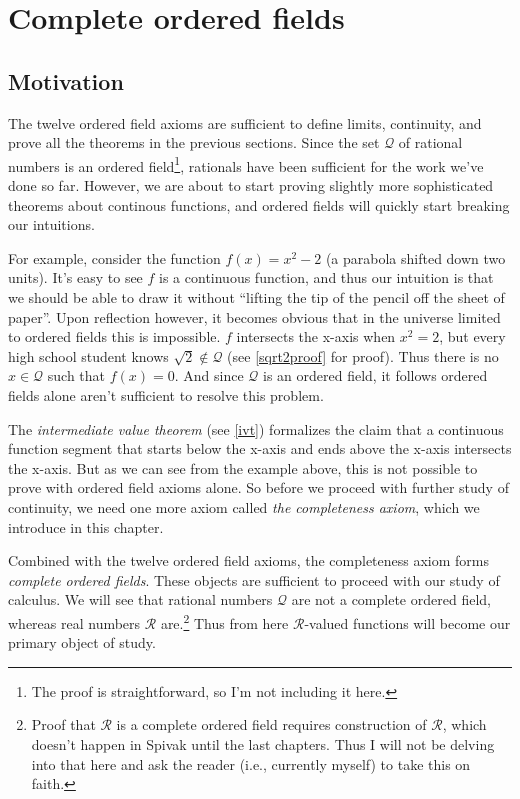\section{Complete ordered fields}

\subsection{Motivation}
The twelve ordered field axioms are sufficient to define limits,
continuity, and prove all the theorems in the previous sections. Since
the set $\mathcal{Q}$ of rational numbers is an ordered field\footnote{The proof
  is straightforward, so I'm not including it here.}, rationals have
been sufficient for the work we've done so far. However, we are about
to start proving slightly more sophisticated theorems about continous
functions, and ordered fields will quickly start breaking our
intuitions.

\vs

For example, consider the function $f(x)=x^{2}-2$ (a parabola shifted
down two units). It's easy to see $f$ is a continuous function, and
thus our intuition is that we should be able to draw it without
``lifting the tip of the pencil off the sheet of paper''. Upon
reflection however, it becomes obvious that in the universe limited to
ordered fields this is impossible. $f$ intersects the x-axis when
$x^{2}=2$, but every high school student knows
$\sqrt{2}\notin\mathcal{Q}$ (see \ref{sqrt2proof} for proof). Thus there is no
$x\in\mathcal{Q}$ such that $f(x)=0$. And since $\mathcal{Q}$ is an ordered field, it
follows ordered fields alone aren't sufficient to resolve this
problem.

\vs

The \textit{intermediate value theorem} (see \ref{ivt}) formalizes the
claim that a continuous function segment that starts below the x-axis
and ends above the x-axis intersects the x-axis. But as we can see
from the example above, this is not possible to prove with ordered
field axioms alone. So before we proceed with further study of
continuity, we need one more axiom called \textit{the completeness
  axiom}, which we introduce in this chapter.

\vs

Combined with the twelve ordered field axioms, the completeness axiom
forms \textit{complete ordered fields}. These objects are sufficient
to proceed with our study of calculus. We will see that rational
numbers $\mathcal{Q}$ are not a complete ordered field, whereas real numbers
$\mathcal{R}$ are.\footnote{Proof that $\mathcal{R}$ is a complete ordered field requires
  construction of $\mathcal{R}$, which doesn't happen in Spivak until the last
  chapters. Thus I will not be delving into that here and ask the
  reader (i.e., currently myself) to take this on faith.} Thus from
here $\mathcal{R}$-valued functions will become our primary object of study.

